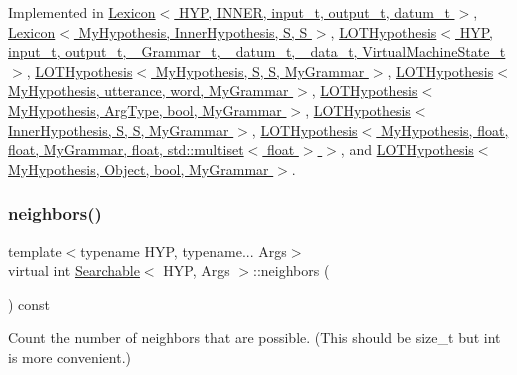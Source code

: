 Implemented in \hyperlink{class_lexicon_ad237c78e3435223f344d153da3baba9b}{Lexicon$<$ H\+Y\+P, I\+N\+N\+E\+R, input\+\_\+t, output\+\_\+t, datum\+\_\+t $>$}, \hyperlink{class_lexicon_ad237c78e3435223f344d153da3baba9b}{Lexicon$<$ My\+Hypothesis, Inner\+Hypothesis, S, S $>$}, \hyperlink{class_l_o_t_hypothesis_a34fb9e13bc6855d6599c1c3e62d88933}{L\+O\+T\+Hypothesis$<$ H\+Y\+P, input\+\_\+t, output\+\_\+t, \+\_\+\+Grammar\+\_\+t, \+\_\+datum\+\_\+t, \+\_\+data\+\_\+t, Virtual\+Machine\+State\+\_\+t $>$}, \hyperlink{class_l_o_t_hypothesis_a34fb9e13bc6855d6599c1c3e62d88933}{L\+O\+T\+Hypothesis$<$ My\+Hypothesis, S, S, My\+Grammar $>$}, \hyperlink{class_l_o_t_hypothesis_a34fb9e13bc6855d6599c1c3e62d88933}{L\+O\+T\+Hypothesis$<$ My\+Hypothesis, utterance, word, My\+Grammar $>$}, \hyperlink{class_l_o_t_hypothesis_a34fb9e13bc6855d6599c1c3e62d88933}{L\+O\+T\+Hypothesis$<$ My\+Hypothesis, Arg\+Type, bool, My\+Grammar $>$}, \hyperlink{class_l_o_t_hypothesis_a34fb9e13bc6855d6599c1c3e62d88933}{L\+O\+T\+Hypothesis$<$ Inner\+Hypothesis, S, S, My\+Grammar $>$}, \hyperlink{class_l_o_t_hypothesis_a34fb9e13bc6855d6599c1c3e62d88933}{L\+O\+T\+Hypothesis$<$ My\+Hypothesis, float, float, My\+Grammar, float, std\+::multiset$<$ float $>$ $>$}, and \hyperlink{class_l_o_t_hypothesis_a34fb9e13bc6855d6599c1c3e62d88933}{L\+O\+T\+Hypothesis$<$ My\+Hypothesis, Object, bool, My\+Grammar $>$}.

\mbox{\label{class_searchable_aec30063fcc9bed5d005f8318efa8492d}} 
\subsubsection{\texorpdfstring{neighbors()}{neighbors()}}
{\footnotesize\ttfamily template$<$typename H\+YP, typename... Args$>$ \\
virtual int \hyperlink{class_searchable}{Searchable}$<$ H\+YP, Args $>$\+::neighbors (\begin{DoxyParamCaption}{ }\end{DoxyParamCaption}) const\hspace{0.3cm}{\ttfamily [pure virtual]}}



Count the number of neighbors that are possible. (This should be size\+\_\+t but int is more convenient.) 



